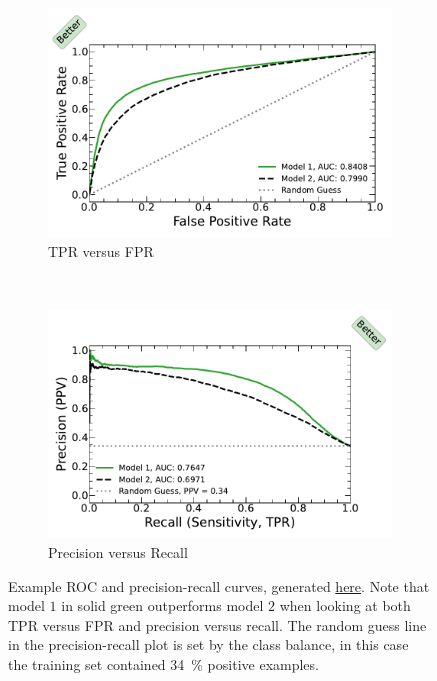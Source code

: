 \begin{figure}
\centering
  \begin{subfigure}[c]{0.48\textwidth}\centering
  \includegraphics[width=\textwidth,trim={0.18cm 0.3cm 0.18cm 0.3cm},clip]{figures/ml/roc_curves/roc_model_1_model_2}%
  \caption{TPR versus FPR}
  \label{fig:ml:roc:standard}
  \end{subfigure}
  ~
  \begin{subfigure}[c]{0.48\textwidth}\centering
  \includegraphics[width=\textwidth,trim={0.18cm 0.3cm 0.18cm 0.3cm},clip]{figures/ml/roc_curves/roc_precision_recall_model_1_model_2}%
  \caption{Precision versus Recall}
  \label{fig:ml:roc:precision_recall}
  \end{subfigure}
\caption{
Example ROC and precision-recall curves, generated \href{https://github.com/mepland/data_science_notes/blob/main/plots/plots.ipynb}{here}.
Note that model $1$ in solid green outperforms model $2$ when looking at both TPR versus FPR and precision versus recall.
The random guess line in the precision-recall plot is set by the class balance,
in this case the training set contained \SI{34}{\percent} positive examples.
}
\label{fig:ml:roc}
\end{figure}

